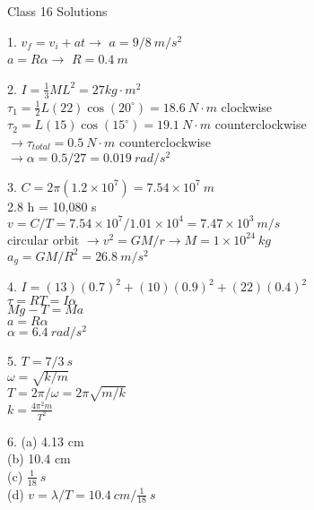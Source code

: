 \documentclass[12pt]{article}
\begin{document}
{\centering
\large Class 16 Solutions \par
}
\hfill \break \vspace{-4mm}

1. $v_f = v_i + at \rightarrow$ $a = 9/8\ m/s^2$ \\
$a = R \alpha \rightarrow$ $R = 0.4\ m$
\hfill \break

2. $I = \frac{1}{3}ML^2 = 27 kg \cdot m^2$ \\
$\tau_1 = \frac{1}{2}L(22)\cos(20^\circ) = 18.6\ N \cdot m$ clockwise \\
$\tau_2 = L(15)\cos(15^\circ) = 19.1\ N \cdot m$ counterclockwise \\
$\rightarrow \tau_{total} = 0.5\ N \cdot m$ counterclockwise \\
$\rightarrow \alpha = 0.5/27 = 0.019\ rad/s^2$
\hfill \break

3. $C = 2 \pi (1.2 \times 10^7) = 7.54 \times 10^7\ m$ \\
2.8 h = 10,080 s \\
$v = C/T = 7.54 \times 10^7 / 1.01 \times 10^4 = 7.47 \times 10^3\ m/s$ \\
circular orbit $\rightarrow v^2 = GM/r \rightarrow M = 1 \times 10^{24}\ kg$ \\
$a_g = GM/R^2 = 26.8\  m/s^2$
\hfill \break

4. $I = (13)(0.7)^2 + (10)(0.9)^2 + (22)(0.4)^2$ \\
$\tau = RT = I \alpha$ \\
$Mg - T = Ma$ \\
$a = R \alpha$ \\
$\alpha = 6.4\ rad/s^2$
\hfill \break

5. $T = 7/3\ s$ \\
$\omega = \sqrt{k/m}$ \\
$T = 2 \pi / \omega = 2 \pi \sqrt{m/k}$ \\
$k = \frac{4 \pi^2 m}{T^2}$
\hfill \break

6. (a) 4.13 cm \\
(b) 10.4 cm \\
(c) $\frac{1}{18}\ s$ \\
(d) $v = \lambda / T = 10.4\ cm / \frac{1}{18}\ s$
\end{document}
